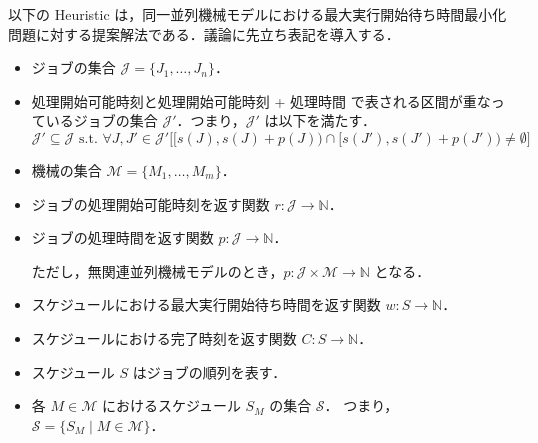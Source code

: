\documentclass[12pt]{optlab-bachelor}
\begin{document}
\noindent 以下の {\sc Heuristic} は，同一並列機械モデルにおける最大実行開始待ち時間最小化問題に対する提案解法である．議論に先立ち表記を導入する．

\begin{itemize}
  \item ジョブの集合 $\mathcal{J} = \{J_1,\ldots,J_n\}$．
  \item 処理開始可能時刻と処理開始可能時刻 + 処理時間 で表される区間が重なっているジョブの集合 $\mathcal{J}'$．つまり，$\mathcal{J}'$ は以下を満たす．
  $$\mathcal{J}' \subseteq \mathcal{J} \text{ s.t. }\forall J,J' \in \mathcal{J}'\big[[s(J),s(J) + p(J)) \cap [s(J'),s(J') + p(J')) \neq \emptyset\big]$$
  \item 機械の集合 $\mathcal{M} = \{M_1,\ldots,M_m\}$．
  \item ジョブの処理開始可能時刻を返す関数 $r : \mathcal{J} \to \mathbb{N}$．
  \item ジョブの処理時間を返す関数 $p : \mathcal{J} \to \mathbb{N}$．

  ただし，無関連並列機械モデルのとき，$p : \mathcal{J} \times \mathcal{M} \to \mathbb{N}$ となる．
  \item スケジュールにおける最大実行開始待ち時間を返す関数 $w : S \to \mathbb{N}$．
  \item スケジュールにおける完了時刻を返す関数 $C : S \to \mathbb{N}$．
  \item スケジュール $S$ はジョブの順列を表す．
  \item 各 $M \in \mathcal{M}$ におけるスケジュール $S_M$ の集合 $\mathcal{S}$．
  つまり，$\mathcal{S} = \{S_M \mid M \in \mathcal{M}\}$．
\end{itemize}
\end{document}
